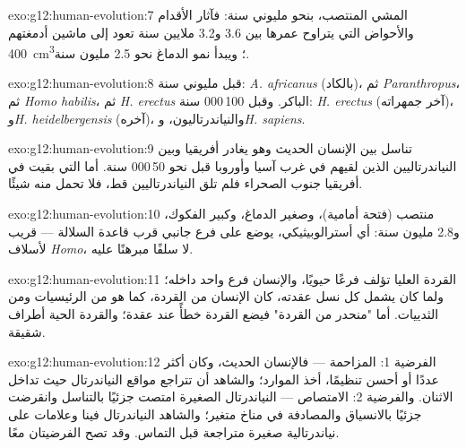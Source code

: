 \begin{solution}{exo:g12:human-evolution:7}
المشي المنتصب، بنحو مليوني سنة: فآثار الأقدام والأحواض التي يتراوح
عمرها بين 3.6 و3.2 ملايين سنة تعود إلى ماشين أدمغتهم \qty{400}{cm^3}؛
ويبدأ نمو الدماغ نحو 2.5 مليون سنة.
\end{solution}

\begin{solution}{exo:g12:human-evolution:8}
قبل مليوني سنة: \emph{A. africanus} (بالكاد)، ثم
\emph{Paranthropus}، ثم \emph{Homo habilis}، ثم \emph{H. erectus}
الباكر. وقبل 100\,000 سنة:
\emph{H. erectus} (آخر جمهراته)، و\emph{H. heidelbergensis} (آخره)،
والنياندرتاليون، و\emph{H. sapiens}.
\end{solution}

\begin{solution}{exo:g12:human-evolution:9}
تناسل بين الإنسان الحديث وهو يغادر أفريقيا وبين النياندرتاليين الذين
لقيهم في غرب آسيا وأوروبا قبل نحو 50\,000 سنة. أما  التي بقيت
في أفريقيا جنوب الصحراء فلم تلق النياندرتاليين قط، فلا تحمل منه شيئًا.
\end{solution}

\begin{solution}{exo:g12:human-evolution:10}
منتصب (فتحة أمامية)، وصغير الدماغ، وكبير الفكوك، و2.8 مليون سنة: أي
أسترالوبيثيكي، يوضع على فرع جانبي قرب قاعدة السلالة --- قريب لأسلاف
\emph{Homo}، لا سلفًا مبرهنًا عليه.
\end{solution}

\begin{solution}{exo:g12:human-evolution:11}
القردة العليا تؤلف فرعًا حيويًا، والإنسان فرع واحد داخله؛ ولما كان
 يشمل كل نسل عقدته، كان الإنسان من القردة، كما هو من
الرئيسيات ومن الثدييات. أما "منحدر من القردة" فيضع القردة خطأً عند
عقدة؛ والقردة الحية أطراف شقيقة.
\end{solution}

\begin{solution}{exo:g12:human-evolution:12}
الفرضية 1: المزاحمة --- فالإنسان الحديث، وكان أكثر عددًا أو أحسن
تنظيمًا، أخذ الموارد؛ والشاهد أن تتراجع مواقع النياندرتال حيث تداخل
الاثنان. والفرضية 2: الامتصاص ---  النياندرتال الصغيرة امتصت
جزئيًا بالتناسل وانقرضت جزئيًا بالانسياق والمصادفة في مناخ متغير؛
والشاهد  النياندرتال فينا وعلامات على  نياندرتالية صغيرة
متراجعة قبل التماس. وقد تصح الفرضيتان معًا.
\end{solution}

